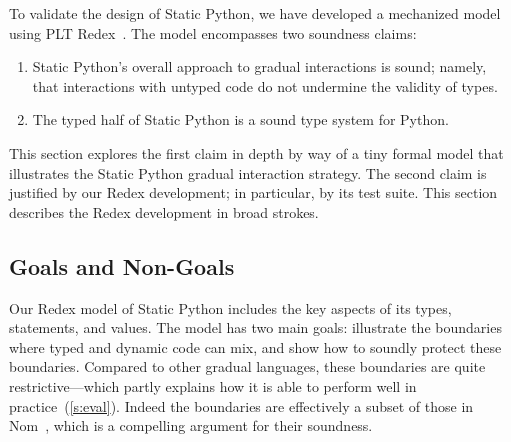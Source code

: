 \documentclass[english,cleveref,submission]{programming}
\newcommand{\SP}{Static Python}
\begin{document}




To validate the design of \SP{}, we have developed a mechanized model using PLT
Redex~\cite{kcdeffmrtf-popl-2012}.
The model encompasses two soundness claims:
\begin{enumerate}
  \item
    \SP{}'s overall approach to gradual interactions is sound; namely, that interactions
    with untyped code do not undermine the validity of types.
  \item
    The typed half of \SP{} is a sound type system for Python.
\end{enumerate}
This section explores the first claim in depth by way of a tiny formal model
that illustrates the \SP{} gradual interaction strategy.
The second claim is justified by our Redex development;
in particular, by its test suite.
This section describes the Redex development in broad strokes.


\subsection{Goals and Non-Goals}

Our Redex model of \SP{} includes the key aspects of its types,
statements, and values.
The model has two main goals:
illustrate the boundaries where typed and dynamic code can mix,
and show how to soundly protect these boundaries.
Compared to other gradual languages, these boundaries are quite restrictive---which
partly explains how it is able to perform well in practice~(\cref{s:eval}).
Indeed the boundaries are effectively a subset of those in Nom~\cite{mt-oopsla-2021},
which is a compelling argument for their soundness.
\end{document}
